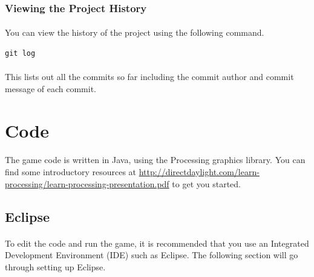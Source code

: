\documentclass[11pt]{article}
\begin{document}
\subsubsection{Viewing the Project History}
\paragraph{}
You can view the history of the project using the following command.
\begin{lstlisting}
git log
\end{lstlisting}
\paragraph{}
This lists out all the commits so far including the commit author and commit message of each commit.
\section{Code}
\paragraph{}
The game code is written in Java, using the Processing graphics library. You can find some introductory resources at \url{http://directdaylight.com/learn-processing/learn-processing-presentation.pdf} to get you started.
\subsection{Eclipse}
\paragraph{}
To edit the code and run the game, it is recommended that you use an Integrated Development Environment (IDE) such as Eclipse. The following section will go through setting up Eclipse.
\end{document}
